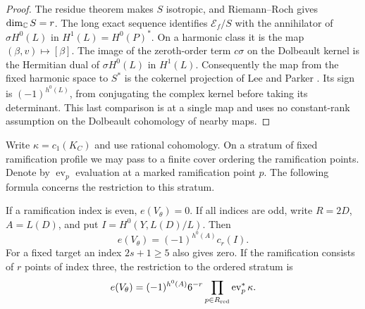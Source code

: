 \begin{proof}
The residue theorem makes \(S\) isotropic, and Riemann--Roch gives
\(\dim_\mathbb C S=r\). The long exact sequence identifies
\(\mathcal E_f/S\) with the annihilator of \(\sigma H^0(L)\) in
\(H^1(L)=H^0(P)^*\). On a harmonic class it is the map
\((\beta,v)\mapsto[\beta]\). The image of the zeroth-order term \(c\sigma\) on the Dolbeault kernel is the Hermitian dual of \(\sigma H^0(L)\) in \(H^1(L)\).
Consequently the map from the fixed harmonic space to \(S^*\)
is the cokernel projection of Lee and Parker
\cite[Lemma~12.1 and Proposition~12.2]{lpob}. Its sign is
\((-1)^{h^0(L)}\), from conjugating the complex kernel before taking
its determinant. This last comparison is at a single map and uses
no constant-rank assumption on the Dolbeault cohomology of nearby maps.
\end{proof}

Write \(\kappa=c_1(K_C)\) and use rational cohomology. On a stratum
of fixed ramification profile we may pass to a finite cover ordering
the ramification points. Denote by \(\operatorname{ev}_p\) evaluation
at a marked ramification point \(p\). The following formula concerns
the restriction to this stratum.

\begin{theorem}\label{p8-thm:profiles}
If a ramification index is even, \(e(V_\theta)=0\). If all indices
are odd, write \(R=2D\), \(A=L(D)\), and put
\(I=H^0(Y,L(D)/L)\). Then
\begin{equation}\label{p8-eq:odd-profile-euler}
                 e(V_\theta)=(-1)^{h^0(A)}c_r(I).
\end{equation}
For a fixed target an index \(2s+1\ge5\) also gives zero. If the
ramification consists of \(r\) points of index three, the restriction
to the ordered stratum is
\begin{equation}\label{p8-eq:triple-profile-euler}
             e(V_\theta)=(-1)^{h^0(A)}6^{-r}
                           \prod_{p\in R_{\rm red}}\operatorname{ev}_p^*\kappa .
\end{equation}
\end{theorem}

